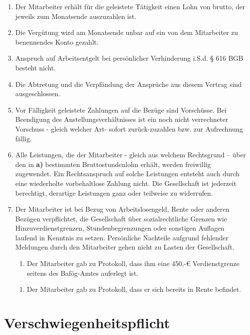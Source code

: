 \documentclass[twoside,a4paper]{scrreprt}
\begin{document}
    \centerline{ }
    \begin{enumerate}[label=(\alph*)]
    	\ifdefined\pauschal\item Der Mitarbeiter erhält für die geleistete Tätigkeit einen Lohn von \Lohn \white brutto, der jeweils zum Monatsende auszuzahlen ist.
    	\fi
    	\item Die Vergütung wird am Monatsende unbar auf ein von dem Mitarbeiter zu benennendes Konto gezahlt.
    	\item Anspruch auf Arbeitsentgelt bei persönlicher Verhinderung i.S.d. § 616 BGB besteht nicht.
    	\item Die Abtretung und die Verpfändung der Ansprüche aus diesem Vertrag sind ausgeschlossen.
    	\item Vor Fälligkeit geleistete Zahlungen auf die Bezüge sind Vorschüsse. Bei Beendigung des Anstellungsverhältnisses ist ein noch nicht verrechneter Vorschuss - gleich welcher Art- sofort zurück-zuzahlen bzw. zur Aufrechnung fällig.
    	\item Alle Leistungen, die der Mitarbeiter - gleich aus welchem Rechtsgrund – über den in \textbf{a)} bestimmten Bruttostundenlohn erhält, werden freiwillig zugewendet. Ein Rechtsanspruch auf solche Leistungen entsteht auch durch eine wiederholte vorbehaltlose Zahlung nicht. Die Gesellschaft ist jederzeit berechtigt, derartige Leistungen ganz oder teilweise zu widerrufen.
    	\item Der Mitarbeiter ist bei Bezug von Arbeitslosengeld, Rente oder anderen Bezügen verpflichtet, die Gesellschaft über sozialrechtliche Grenzen wie Hinzuverdienstgrenzen, Stundenbegrenzungen oder sonstigen Auflagen laufend in Kenntnis zu setzen. Persönliche Nachteile aufgrund fehlender Meldungen durch den Mitarbeiter gehen nicht zu Lasten der Gesellschaft.
    	\ifdefined\bafoeg\begin{enumerate}
    	    \item Der Mitarbeiter gab zu Protokoll, dass ihm eine 450,-€ Verdienstgrenze seitens des Bafög-Amtes auferlegt ist.
    	\end{enumerate}
    	\fi
    	\ifdefined\rente\begin{enumerate}
    	    \item Der Mitarbeiter gab zu Protokoll, dass er sich bereits in Rente befindet.
    	\end{enumerate}
    	\fi
    \end{enumerate}
\newpage
      
\newpage
\section{Verschwiegenheitspflicht}
\end{document}
